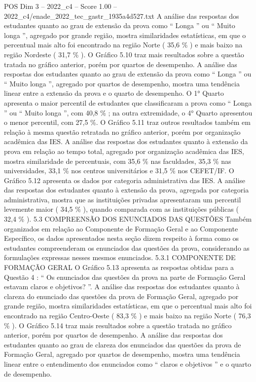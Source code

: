 \begin{textsample}{POS Dim 3 – 2022\_c4 – Score 1.00 – 2022\_c4/enade\_2022\_tec\_gastr\_1935a4d527.txt}
A análise das respostas dos estudantes quanto ao grau de extensão da prova como “ Longa ” ou “ Muito longa ”, agregado por grande região, mostra similaridades estatísticas, em que o percentual mais alto foi encontrado na região Norte ( 35,6 \% ) e mais baixo na região Nordeste ( 31,7 \% ).
O Gráfico 5.10 traz mais resultados sobre a questão tratada no gráfico anterior, porém por quartos de desempenho.
A análise das respostas dos estudantes quanto ao grau de extensão da prova como “ Longa ” ou “ Muito longa ”, agregado por quartos de desempenho, mostra uma tendência linear entre a extensão da prova e o quarto de desempenho.
O 1{\EmojiFont °} Quarto apresenta o maior percentil de estudantes que classificaram a prova como “ Longa ” ou “ Muito longa ”, com 40,8 \% ; na outra extremidade, o 4{\EmojiFont °} Quarto apresentou o menor percentil, com 27,5 \%.
O Gráfico 5.11 traz outros resultados também em relação à mesma questão retratada no gráfico anterior, porém por organização acadêmica das IES.
A análise das respostas dos estudantes quanto à extensão da prova em relação ao tempo total, agregado por organização acadêmica das IES, mostra similaridade de percentuais, com 35,6 \% nas faculdades, 35,3 \% nas universidades, 33,1 \% nos centros universitários e 31,5 \% nos CEFET/IF.
O Gráfico 5.12 apresenta os dados por categoria administrativa das IES.
A análise das respostas dos estudantes quanto à extensão da prova, agregada por categoria administrativa, mostra que as instituições privadas apresentaram um percentil levemente maior ( 34,5 \% ), quando comparada com as instituições públicas ( 32,4 \% ). 5.3 COMPREENSÃO DOS ENUNCIADOS DAS QUESTÕES Também organizados em relação ao Componente de Formação Geral e ao Componente Específico, os dados apresentados nesta seção dizem respeito à forma como os estudantes compreenderam os enunciados das questões da prova, considerando as formulações expressas nesses mesmos enunciados. 5.3.1 COMPONENTE DE FORMAÇÃO GERAL O Gráfico 5.13 apresenta as respostas obtidas para a Questão 4 : “ Os enunciados das questões da prova na parte de Formação Geral estavam claros e objetivos? ”.
A análise das respostas dos estudantes quanto à clareza do enunciado das questões da prova de Formação Geral, agregado por grande região, mostra similaridades estatísticas, em que o percentual mais alto foi encontrado na região Centro-Oeste ( 83,3 \% ) e mais baixo na região Norte ( 76,3 \% ).
O Gráfico 5.14 traz mais resultados sobre a questão tratada no gráfico anterior, porém por quartos de desempenho.
A análise das respostas dos estudantes quanto ao grau de clareza dos enunciados das questões da prova de Formação Geral, agregado por quartos de desempenho, mostra uma tendência linear entre o entendimento dos enunciados como “ claros e objetivos ” e o quarto de desempenho.

\end{textsample}
